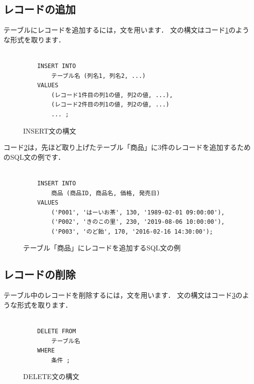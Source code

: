 \subsection{レコードの追加}
テーブルにレコードを追加するには，文を用います．
文の構文はコード\ref{code:insert-into-structure}のような形式を取ります．
\begin{figure}[!htbp]
    \begin{verbatim}

    INSERT INTO
        テーブル名 (列名1, 列名2, ...)
    VALUES
        (レコード1件目の列1の値, 列2の値, ...),
        (レコード2件目の列1の値, 列2の値, ...)
        ... ;
    \end{verbatim}
    \captionsetup{name=コード}
    \caption{INSERT文の構文}
    \label{code:insert-into-structure}
\end{figure}

コード\ref{code:insert-into-example}は，先ほど取り上げたテーブル「商品」に3件のレコードを追加するためのSQL文の例です．
\begin{figure}[!htbp]
    \begin{verbatim}

    INSERT INTO
        商品 (商品ID, 商品名, 価格, 発売日)
    VALUES
        ('P001', 'はーいお茶', 130, '1989-02-01 09:00:00'),
        ('P002', 'きのこの里', 230, '2019-08-06 10:00:00'),
        ('P003', 'のど飴', 170, '2016-02-16 14:30:00');

    \end{verbatim}
    \captionsetup{name=コード}
    \caption{テーブル「商品」にレコードを追加するSQL文の例}
    \label{code:insert-into-example}
\end{figure}

\subsection{レコードの削除}
テーブル中のレコードを削除するには，文を用います．
文の構文はコード\ref{code:delete-structure}のような形式を取ります．
\begin{figure}[!htbp]
    \begin{verbatim}

    DELETE FROM
        テーブル名
    WHERE
        条件 ;

    \end{verbatim}
    \captionsetup{name=コード}
    \caption{DELETE文の構文}
    \label{code:delete-structure}
\end{figure}

